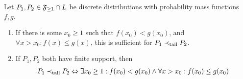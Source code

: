 \documentclass[a4paper]{scrreprt}
\begin{document}
    \begin{thm}
        Let $P_1, P_2 \in \mathfrak{F}_{\geq 1} \cap L$ be discrete distributions with probability mass functions $f, g$.
        \begin{enumerate}
            \item 
            If there is some $x_0 \geq 1$ such that $f(x_0) < g(x_0)$, and $\forall x > x_0: f(x) \leq g(x)$, this is sufficient for $P_1 \prec_{\text{tail}} P_2$.
            \label{item:discreteTailOrder-DominatingPointSuffCondition}
            
            \item 
            If $P_1, P_2$ both have finite support, then
            \begin{gather}
                P_1 \prec_{\text{tail}} P_2 \Leftrightarrow \exists x_0 \geq 1: f(x_0) < g(x_0) \wedge \forall x > x_0: f(x_0) \leq g(x_0)
                \label{eq:discreteFiniteTailOrder-DominatingPointEquivalence}
            \end{gather}
            \label{item:discreteFiniteTailOrder-DominatingPointEquivalence}
        \end{enumerate}
        \label{thm:discreteTailOrderSuffConditions}
    \end{thm}
\end{document}
